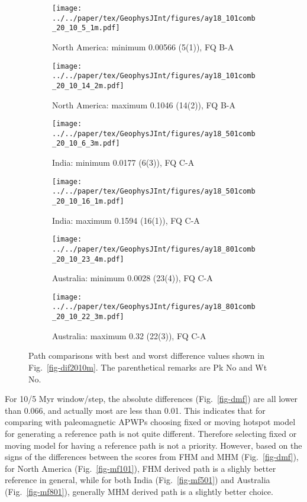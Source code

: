 \begin{figure*}
	\centering
	\begin{subfigure}{.43\textwidth}
		\texttt{[image: ../../paper/tex/GeophysJInt/figures/ay18\_101comb\_20\_10\_5\_1m.pdf]}
		\caption{North America: minimum 0.00566 (5(1)), FQ B-A}
	\end{subfigure}
	\begin{subfigure}{.43\textwidth}
		\texttt{[image: ../../paper/tex/GeophysJInt/figures/ay18\_101comb\_20\_10\_14\_2m.pdf]}
		\caption{North America: maximum 0.1046 (14(2)), FQ B-A}
	\end{subfigure}
	\vspace{.1em}
	\begin{subfigure}{.43\textwidth}
		\texttt{[image: ../../paper/tex/GeophysJInt/figures/ay18\_501comb\_20\_10\_6\_3m.pdf]}
		\caption{India: minimum 0.0177 (6(3)), FQ C-A}
	\end{subfigure}
	\begin{subfigure}{.43\textwidth}
		\texttt{[image: ../../paper/tex/GeophysJInt/figures/ay18\_501comb\_20\_10\_16\_1m.pdf]}
		\caption{India: maximum 0.1594 (16(1)), FQ C-A}
	\end{subfigure}
	\vspace{.1em}
	\begin{subfigure}{.43\textwidth}
		\texttt{[image: ../../paper/tex/GeophysJInt/figures/ay18\_801comb\_20\_10\_23\_4m.pdf]}
		\caption{Australia: minimum 0.0028 (23(4)), FQ C-A}
	\end{subfigure}
	\begin{subfigure}{.43\textwidth}
		\texttt{[image: ../../paper/tex/GeophysJInt/figures/ay18\_801comb\_20\_10\_22\_3m.pdf]}
		\caption{Australia: maximum 0.32 (22(3)), FQ C-A}
	\end{subfigure}
	\caption[Best and worst $\mathcal{CPD}$s (20/10 Myr window/step;
MHM)]{Path comparisons with best and worst difference values shown in
Fig.~\ref{fig-dif2010m}. The parenthetical remarks are Pk No and Wt No.}\label{fig-dif2010bwm}
\end{figure*}

For 10/5 Myr window/step, the absolute differences (Fig.~\ref{fig-dmf}) are all
lower than 0.066, and actually most are less than 0.01. This indicates that for
comparing with paleomagnetic APWPs choosing fixed or moving hotspot model for
generating a reference path is not quite different. Therefore selecting fixed or
moving model for having a reference path is not a priority. However, based on
the signs of the differences between the scores from FHM and MHM
(Fig.~\ref{fig-dmf}), for North America (Fig.~\ref{fig-mf101}), FHM derived path
is a slighly better reference in general, while for both India
(Fig.~\ref{fig-mf501}) and Australia (Fig.~\ref{fig-mf801}), generally MHM
derived path is a slightly better choice.

